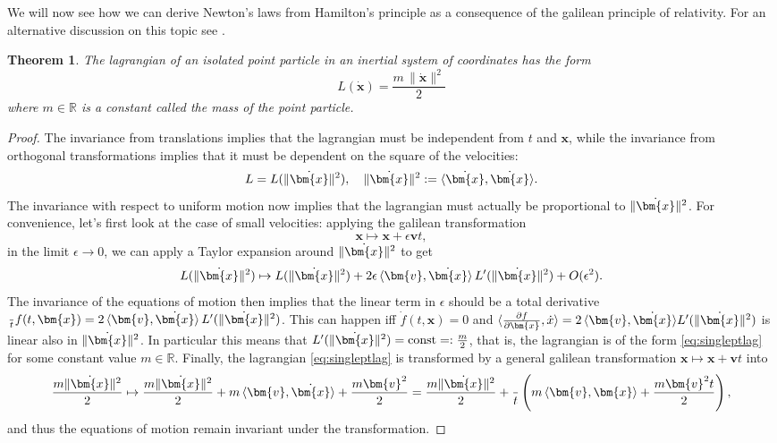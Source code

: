 \documentclass[english,fontsize=11pt,paper=a5,oneside]{scrbook}
\newcommand{\R}{\mathbb{R}}
\newcommand{\bx}{\bm{x}}
\newcommand{\lag}{\langle}
\newcommand{\rag}{\rangle}
\let\d\relax
\DeclareMathOperator{\d}{d}
\newtheorem{theorem}{Theorem}[chapter]
\theoremstyle{definition}
\begin{document}
We will now see how we can derive Newton's laws from Hamilton's principle as a consequence of the galilean principle of relativity. For an alternative discussion on this topic see \cite[Chapters 1.1 and 1.2]{book:arnold}.

\begin{theorem}
The lagrangian of an isolated point particle in an inertial system of coordinates has the form 
\begin{equation}\label{eq:singleptlag}
    L(\dot{\bm{x}}) = \frac{m\,\|\dot{\bm{x}}\|^2}2
\end{equation}
where $m\in\R$ is a constant called the \emph{mass} of the point particle.
\end{theorem}
\begin{proof}
    The invariance from translations implies that the lagrangian must be independent from $t$ and $\bx$, while the invariance from orthogonal transformations implies that it must be dependent on the square of the velocities:
    \begin{equation}
        L = L(\|\dot\bx\|^2), \quad \|\dot\bx\|^2 := \lag\dot \bx, \dot \bx\rag.
    \end{equation}
    The invariance with respect to uniform motion now implies that the lagrangian must actually be proportional to $\|\dot\bx\|^2$.
    For convenience, let's first look at the case of small velocities: applying the galilean transformation
    \begin{equation}
        \bx \mapsto \bx + \epsilon \bm{v}t,
    \end{equation}
    in the limit $\epsilon \to 0$, we can apply a Taylor expansion around $\|\dot\bx\|^2$ to get
    \begin{equation}
        L(\|\dot\bx\|^2) \mapsto L(\|\dot\bx\|^2) + 2\epsilon\,\lag\bm{v}, \dot\bx\rag\,L'(\|\dot\bx\|^2) + O(\epsilon^2).
    \end{equation}
    The invariance of the equations of motion then implies that the linear term in $\epsilon$ should be a total derivative $\frac{\d }{\d t} f(t, \bx) = 2\,\lag\bm{v}, \dot\bx\rag\,L'(\|\dot\bx\|^2)$.
    This can happen iff $\dot f(t, \bx) = 0$ and $\lag \frac{\partial f}{\partial \bx}, \dot x\rag  = 2\,\lag\bm{v}, \dot\bx\rag L'(\|\dot\bx\|^2)$ is linear also in $\|\dot\bx\|^2$.
    In particular this means that $L'(\|\dot\bx\|^2) = \mathrm{const} =: \frac{m}2$, that is, the lagrangian is of the form \eqref{eq:singleptlag} for some constant value $m\in\R$.
    Finally, the lagrangian \eqref{eq:singleptlag} is transformed by a general galilean transformation $\bx \mapsto \bx + \bm{v}t$ into
    \begin{equation}
        \frac{m \|\dot\bx\|^2}2 \mapsto
        \frac{m \|\dot\bx\|^2}2 + m\,\lag\bm{v},\dot\bx\rag + \frac{m \bm{v}^2}2
        = \frac{m \|\dot\bx\|^2}2 + \frac{\d }{\d t}\left(m\,\lag\bm{v},\bx\rag + \frac{m \bm{v}^2 t}2\right),
    \end{equation}
    and thus the equations of motion remain invariant under the transformation.
\end{proof}
\end{document}
